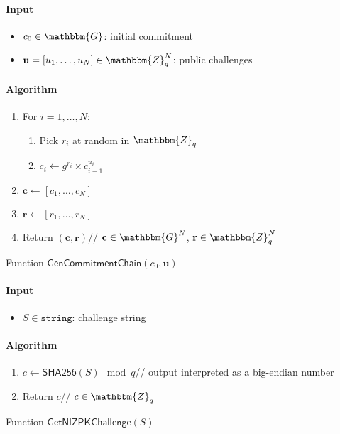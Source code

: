 \documentclass[a4paper]{article}
\newcommand{\G}{\mathbbm{G}}
\newcommand{\Z}{\mathbbm{Z}}
\newcommand{\shatwo}{\textsf{SHA256}}
\newcommand{\jstring}{\texttt{string}}
\begin{document}
\begin{table}
  \begin{framed}
    \noindent\paragraph{Input}
    \begin{itemize}
    \item $c_0\in\G$: initial commitment
    \item $\textbf{u}=[u_1,\dots,u_N]\in\Z_q^N$: public challenges
    \end{itemize}
    \noindent\paragraph{Algorithm}
    \begin{enumerate}
    \item For $i=1,\dots,N$:
      \begin{enumerate}
      \item Pick $r_i$ at random in $\Z_q$
      \item $c_i\leftarrow g^{r_i}\times c_{i-1}^{u_i}$
      \end{enumerate}
    \item $\textbf{c}\leftarrow[c_1,\dots,c_N]$
    \item $\textbf{r}\leftarrow[r_1,\dots,r_N]$
    \item Return $(\textbf{c},\textbf{r})$\hfill//
      $\textbf{c}\in\G^N$, $\textbf{r}\in\Z_q^N$
    \end{enumerate}
  \end{framed}
  \caption{Function $\mathsf{GenCommitmentChain}(c_0,\textbf{u})$}
  \label{gen-commitment-chain}
\end{table}

\begin{table}
  \begin{framed}
    \noindent\paragraph{Input}
    \begin{itemize}
    \item $S\in\jstring$: challenge string
    \end{itemize}
    \noindent\paragraph{Algorithm}
    \begin{enumerate}
    \item $c\leftarrow\shatwo(S)\mod q$\hfill// output interpreted as
      a big-endian number
    \item Return $c$\hfill// $c\in\Z_q$
    \end{enumerate}
  \end{framed}
  \caption{Function $\mathsf{GetNIZPKChallenge}(S)$}
  \label{get-nizkp-challenge}
\end{table}

\FloatBarrier



\end{document}
